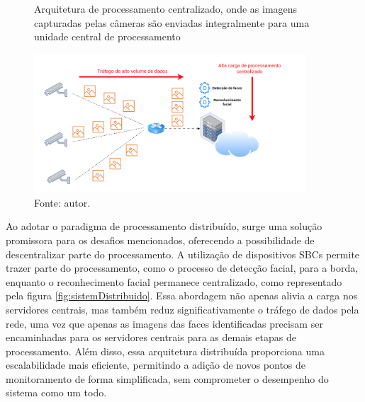 \begin{figure}[H]
    \centering
    \caption[Arquitetura de processamento centralizado, onde as imagens capturadas pelas câmeras são enviadas integralmente para uma unidade central de processamento.]{Arquitetura de processamento centralizado, onde as imagens capturadas pelas câmeras são enviadas integralmente para uma unidade central de processamento}
    \includegraphics[width=0.9\textwidth]{Cap1_Introducao/Figures/sistema_centralizado.png}
    \caption*{Fonte: autor.}
    \label{fig:sistemCentralizado}
\end{figure}

Ao adotar o paradigma de processamento distribuído, surge uma solução promissora para os desafios mencionados, oferecendo a possibilidade de descentralizar parte do processamento. A utilização de dispositivos SBCs permite trazer parte do processamento, como o processo de detecção facial, para a borda, enquanto o reconhecimento facial permanece centralizado, como representado pela figura \ref{fig:sistemDistribuido}. Essa abordagem não apenas alivia a carga nos servidores centrais, mas também reduz significativamente o tráfego de dados pela rede, uma vez que apenas as imagens das faces identificadas precisam ser encaminhadas para os servidores centrais para as demais etapas de processamento. Além disso, essa arquitetura distribuída proporciona uma escalabilidade mais eficiente, permitindo a adição de novos pontos de monitoramento de forma simplificada, sem comprometer o desempenho do sistema como um todo.

